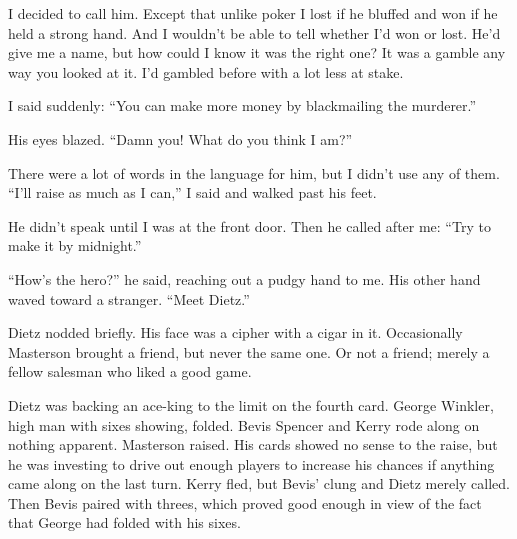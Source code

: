 \documentclass{novel}
\begin{document}
I decided to call him. Except that unlike poker I lost if he bluffed and won if he held a strong hand. And I wouldn’t be able to tell whether I’d won or lost. He’d give me a name, but how could I know it was the right one? It was a gamble any way you looked at it. I’d gambled before with a lot less at stake.

I said suddenly: “You can make more money by blackmailing the murderer.”

His eyes blazed. “Damn you! What do you think I am?”

There were a lot of words in the language for him, but I didn’t use any of them. “I’ll raise as much as I can,” I said and walked past his feet.

He didn’t speak until I was at the front door. Then he called after me: “Try to make it by midnight.”

\vspace{2\nbs}
\clearpage
\thispagestyle{empty}
\begin{ChapterStart}
\vspace{3\nbs}
\end{ChapterStart}

“How’s the hero?” he said, reaching out a pudgy hand to me. His other hand waved toward a stranger. “Meet Dietz.”

Dietz nodded briefly. His face was a cipher with a cigar in it. Occasionally Masterson brought a friend, but never the same one. Or not a friend; merely a fellow salesman who liked a good game.

Dietz was backing an ace-king to the limit on the fourth card. George Winkler, high man with sixes showing, folded. Bevis Spencer and Kerry rode along on nothing apparent. Masterson raised. His cards showed no sense to the raise, but he was investing to drive out enough players to increase his chances if anything came along on the last turn. Kerry fled, but Bevis’ clung and Dietz merely called. Then Bevis paired with threes, which proved good enough in view of the fact that George had folded with his sixes.
\end{document}
